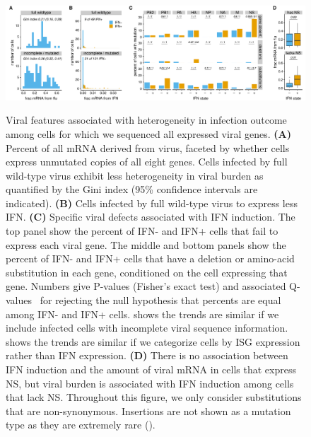 \documentclass[9pt,lineno]{elife}
\begin{document}
\begin{figure}
\begin{fullwidth}
{\centering
\includegraphics[width=\linewidth]{figures/single_cell_figures/p_mutations.pdf}
}
\caption{
Viral features associated with heterogeneity in infection outcome among cells for which we sequenced all expressed viral genes.
{\bf (A)} 
Percent of all mRNA derived from virus, faceted by whether cells express unmutated copies of all eight genes.
Cells infected by full wild-type virus exhibit less heterogeneity in viral burden as quantified by the Gini index (95\% confidence intervals are indicated).
{\bf (B)}
Cells infected by full wild-type virus to express less IFN.
{\bf (C)}
Specific viral defects associated with IFN induction.
The top panel show the percent of IFN- and IFN+ cells that fail to express each viral gene.
The middle and bottom panels show the percent of IFN- and IFN+ cells that have a deletion or amino-acid substitution in each gene, conditioned on the cell expressing that gene.
Numbers give P-values (Fisher's exact test) and associated Q-values~\citep{storey2003statistical} for rejecting the null hypothesis that percents are equal among IFN- and IFN+ cells. 
 shows the trends are similar if we include infected cells with incomplete viral sequence information. 
 shows the trends are similar if we categorize cells by ISG expression rather than IFN expression.
{\bf (D)}
There is no association between IFN induction and the amount of viral mRNA in cells that express NS, but viral burden is associated with IFN induction among cells that lack NS.
Throughout this figure, we only consider substitutions that are non-synonymous.
Insertions are not shown as a mutation type as they are extremely rare ().
}
\label{fig:mutations}


\end{fullwidth}
\end{figure}
\end{document}
